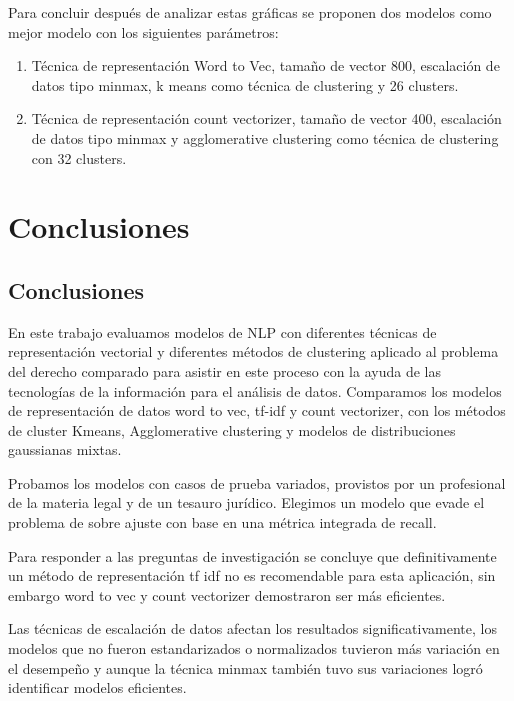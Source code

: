 \documentclass[12pt]{article}
\begin{document}
		Para concluir después de analizar estas gráficas se proponen dos modelos como mejor modelo con los siguientes parámetros:
		
		\begin{enumerate}
			\item Técnica de representación Word to Vec, tamaño de vector 800, escalación de datos tipo minmax, k means como técnica de clustering y 26 clusters.
			
			\item Técnica de representación count vectorizer, tamaño de vector 400, escalación de datos tipo minmax y agglomerative clustering como técnica de clustering con 32 clusters.
			
		\end{enumerate}
						 
			

	\newpage
	\section{Conclusiones}
	\subsection{Conclusiones}
		En este trabajo evaluamos modelos de NLP con diferentes técnicas de representación vectorial y diferentes métodos de clustering aplicado al problema del derecho comparado para asistir en este proceso con la ayuda de las tecnologías de la información para el análisis de datos. 
		Comparamos los modelos de representación de datos word to vec, tf-idf y count vectorizer, con los métodos de cluster Kmeans, Agglomerative clustering y modelos de distribuciones gaussianas mixtas.
		
		Probamos los modelos con casos de prueba variados, provistos por un profesional de la materia legal y de un tesauro jurídico. 
		Elegimos un modelo que evade el problema de sobre ajuste con base en una métrica integrada de recall.
		
		Para responder a las preguntas de investigación se concluye que definitivamente un método de representación tf idf no es recomendable para esta aplicación, sin embargo word to vec y count vectorizer demostraron ser más eficientes.
		
		Las técnicas de escalación de datos afectan los resultados significativamente, los modelos que no fueron estandarizados o normalizados tuvieron más variación en el desempeño y aunque la técnica minmax también tuvo sus variaciones logró identificar modelos eficientes.
						
\end{document}
